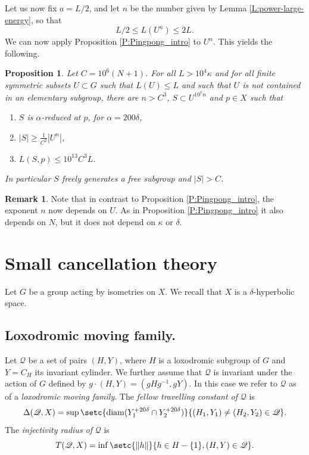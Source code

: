 \documentclass[leqno,a4paper,10pt]{amsart}
\theoremstyle{plain}
\newtheorem{prop}[thm]{Proposition}
\theoremstyle{definition}
\newtheorem{rem}[thm]{Remark}
\theoremstyle{remark}
\DeclareMathOperator{\diam}{diam}
\newcommand{\scrQ}{\mathscr{Q}}
\newcommand{\tlen}[1]{
	\left\| #1\right\|
}
\begin{document}
Let us now fix $a=L/2$, and let $n$ be the number given by Lemma \ref{L:power-large-energy}, so that 
$$L/2 \leqslant L(U^n)\leqslant 2L.$$ 
We can now apply Proposition \ref{P:Pingpong_intro} to $U^n$. This yields the following. 

\begin{prop}\label{P:Pingpong}  Let $C=10^6(N+1)$. For all $L >10^4 \kappa$ and for all finite symmetric subsets $U\subset G$ such that $L(U)\leqslant L$ and such that $U$ is not contained in an elementary subgroup,  there are $n>C^3$, $S\subset U^{10^7n}$ and $p\in X$ such that 
\begin{enumerate}
\item $S$ is $\alpha$-reduced at $p$, for $\alpha=200\delta$,
\item $|S| \geqslant \frac{1}{C^2}|U^n|$,
\item $L(S,p)\leqslant 10^{13} C^3 L$.
\end{enumerate}
In particular $S$ freely generates a free subgroup and $|S|>C$. 
\end{prop}
\begin{rem} Note that in contrast to Proposition \ref{P:Pingpong_intro}, the exponent $n$ now depends on $U$. As in Proposition \ref{P:Pingpong_intro} it also depends on $N$, but it does not depend on $\kappa$ or $\delta$. 
\end{rem}



\section{Small cancellation theory}
\label{subsec:small-cancellation-theory}

Let $G$ be a group acting by isometries on $X$. We recall that $X$ is a $\delta$-hyperbolic space.

\subsection{Loxodromic moving family.}
Let $\scrQ$ be a set of pairs $(H,Y)$, where $H$ is a loxodromic subgroup of $G$ and $Y=C_H$ its invariant cylinder. We further assume that $\scrQ$ is invariant under the action of $G$ defined by $g\cdot (H,Y)=(gHg^{-1},gY)$. 
In this case we refer to $\scrQ$ as of a  
 \emph{loxodromic moving family}. 
 The \emph{fellow travelling constant of} $\scrQ$ is
$$\Delta(\scrQ,X)=\sup\setc{\diam(Y_1^{+20\delta}\cap Y_2^{+20\delta})}{ (H_1,Y_1)\neq (H_2,Y_2)\in\scrQ}.$$
The \emph{injectivity radius of} $\scrQ$ is
$$T(\scrQ,X)=\inf\setc{\tlen{h}}{h\in H-\{1\}, (H,Y)\in\scrQ}.$$
\end{document}
